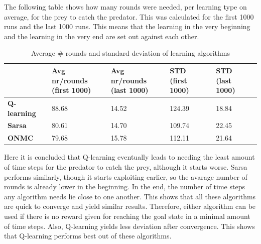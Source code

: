 \documentclass{article}
\begin{document}

The following table shows how many rounds were needed, per learning type on average, for the prey to catch the predator. This was calculated for the first 1000 runs  and the last 1000 runs. This means that the learning in the very beginning and the learning in the very end are set out against each other.

\begin{table}[H]
\begin{center}
\begin{tabular}{| l | l | l | l | l |}
\hline
 & \parbox{2cm}{\textbf{Avg nr/rounds\\ (first 1000)}} & \parbox{2cm}{\textbf{Avg nr/rounds\\ (last 1000)}} & \parbox{2cm}{\textbf{STD\\ (first 1000)}} & \parbox{2cm}{\textbf{STD\\ (last 1000)}} \\
\hline
\textbf{Q-learning} & 88.68 & 14.52 & 124.39 & 18.84 \\
\hline
\textbf{Sarsa} & 80.61 & 14.70 & 109.74 & 22.45 \\
\hline
\textbf{ONMC} & 79.68 & 15.78 & 112.11 & 21.64 \\
\hline
\end{tabular}
\caption{Average \# rounds and standard deviation of learning algorithms}
\end{center}
\end{table}

Here it is concluded that Q-learning eventually leads to needing the least amount of time steps for the predator to catch the prey, although it starts worse. Sarsa performs similarly, though it starts exploiting earlier, so the avarage number of rounds is already lower in the beginning. In the end, the number of time steps any algorithm needs lie close to one another. This shows that all these algorithms are quick to converge and yield similar results. Therefore, either algorithm can be used if there is no reward given for reaching the goal state in a minimal amount of time steps. Also, Q-learning yields less deviation after convergence. This shows that Q-learning performs best out of these algorithms.
\end{document}
